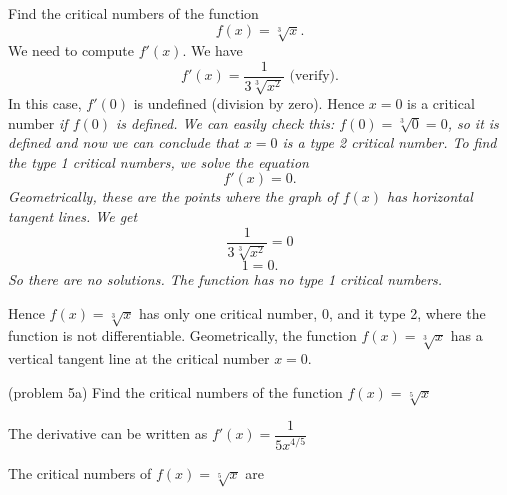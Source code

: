 \documentclass[handout]{ximera}
\begin{document}
\begin{example}[example 5] Find the critical numbers of the function 
\[f(x) = \sqrt[3] x.\]
We need to compute $f'(x)$.  We have
\[f'(x) = \frac{1}{3\sqrt[3]{x^2}} \text{   (verify)}.\]
In this case, $f'(0)$ is undefined (division by zero). Hence $x=0$ is a critical number \it{if}
$f(0)$ is defined.  We can easily check this: $f(0) = \sqrt[3] 0 = 0$, so it is defined and now we can conclude 
that $x=0$ is a type 2 critical number.
To find the type 1 critical numbers, we solve the equation
\[f'(x) = 0.\]
Geometrically, these are the points where the graph of $f(x)$ has horizontal tangent lines.
We get
\[ \frac{1}{3\sqrt[3]{x^2}} =0\]
\[ 1 =0.\]
So there are no solutions.  The function has no type 1 critical numbers.


Hence $f(x) = \sqrt[3] x$ has only one critical number, 0, and it type 2, 
where the function is not differentiable. 
Geometrically, the function $f(x) = \sqrt[3] x$ has a vertical tangent line at the critical number $x = 0$.


\begin{image}
\end{image}

\end{example}

\begin{problem}(problem 5a)
  Find the critical numbers of the function $f(x) = \sqrt[5] x$
  
    \begin{hint}
      The derivative can be written as $f'(x) = \dfrac{1}{5x^{4/5}}$
    \end{hint}
		
    
    
		The critical numbers of $f(x) = \sqrt[5] x$ are
		 \begin{multipleChoice}
		\end{multipleChoice} 
\end{problem}
\end{document}
